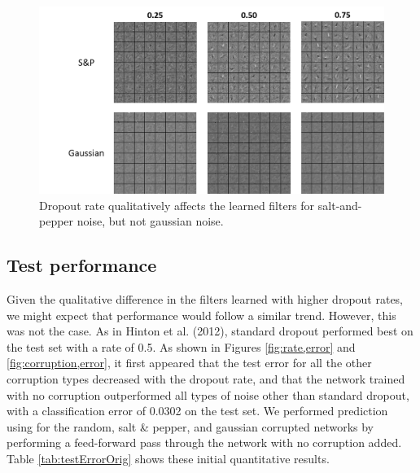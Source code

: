 \documentclass{article} %
\begin{document}
\begin{figure}
\begin{center}
\includegraphics[width=\textwidth]{filtersAndDropoutRateSPGaussian.png}
\caption{Dropout rate qualitatively affects the learned filters for salt-and-pepper noise, but not gaussian noise.}
\end{center}
\end{figure}

\subsection{Test performance}
\label{subsec:milestone_test_performance}
Given the qualitative difference in the filters learned with higher dropout rates, we might expect that performance would follow a similar trend. However, this was not the case. As in Hinton et al. (2012), standard dropout performed best on the test set with a rate of 0.5. As shown in Figures \ref{fig:rate,error} and \ref{fig:corruption,error}, it first appeared that the test error for all the other corruption types decreased with the dropout rate, and that the network trained with no corruption outperformed all types of noise other than standard dropout, with a classification error of 0.0302 on the test set. We performed prediction using for the random, salt \& pepper, and gaussian corrupted networks by performing a feed-forward pass through the network with no corruption added. Table \ref{tab:testErrorOrig} shows these initial quantitative results.
\end{document}
